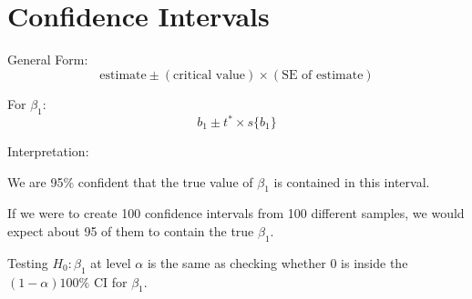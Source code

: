 \documentclass[12pt]{notes}
\begin{document}
\nspace
{}

\begin{minipage}[l][3cm][c]{\textwidth}

\end{minipage}

\section*{Confidence Intervals}

\bi
\item General Form:
\[
\text{estimate} \pm (\text{critical value})\times(\text{SE of estimate})
\]
\item For $\beta_1$:
\[b_1 \pm t^*\times s\{b_1\}\]
\item Interpretation:
\bi
\item We are 95\% confident that the true value of $\beta_1$ is contained in this interval. 
\item If we were to create 100 confidence intervals from 100 different samples, we would expect about 95 of them to contain the true $\beta_1.$
\ei
\ei

\nspace
Testing $H_0: \beta_1$ at level $\alpha$ is the same as checking whether 0 is inside the $(1-\alpha)100\%$ CI for $\beta_1$. 


\begin{minipage}[l][2cm][c]{\textwidth}

\end{minipage}


\begin{minipage}[l][2cm][c]{\textwidth}

\end{minipage}
\end{document}
